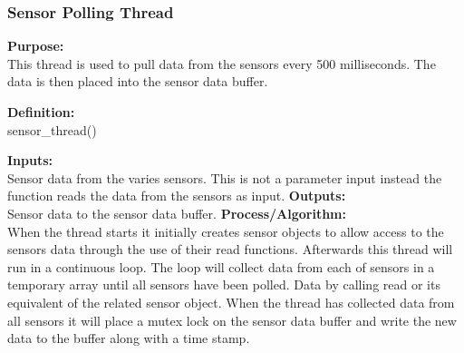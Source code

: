 \documentclass[10pt,draftclsnofoot,onecolumn,compsoc]{IEEEtran}
\begin{document}
\subsubsection{Sensor Polling Thread}
{\bf Purpose:} \\
This thread is used to pull data from the sensors every 500 milliseconds. The data is then placed into the sensor data buffer. \par
{\bf Definition:} \\ 
sensor\_thread() \par
{\bf Inputs:} \\  Sensor data from the varies sensors. This is not a parameter input instead the function reads the data from the sensors as input.
{\bf Outputs:} \\ Sensor data to the sensor data buffer.
{\bf Process/Algorithm:} \\
When the thread starts it initially creates sensor objects to allow access to the sensors data through the use of their read functions. Afterwards this thread will run in a continuous loop. The loop will collect data from each of sensors in a temporary array until all sensors have been polled. Data by calling read or its equivalent of the related sensor object. When the thread has collected data from all sensors it will place a mutex lock on the sensor data buffer and write the new data to the buffer along with a time stamp. \par
\end{document}
